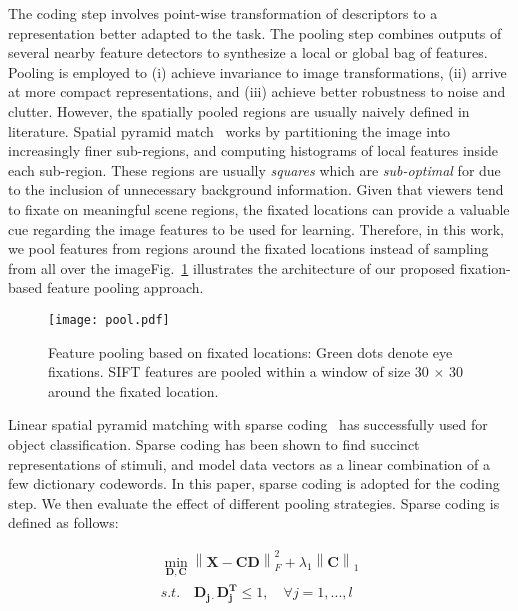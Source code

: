 \documentclass{article}
\begin{document}
The coding step involves point-wise transformation of descriptors to a representation better adapted to the task. The pooling step combines outputs of several nearby feature detectors to synthesize a local or global bag of features. Pooling is employed to (i) achieve invariance to image transformations, (ii) arrive at more compact representations, and (iii) achieve better robustness to noise and clutter. However, the spatially pooled regions are usually naively defined in literature. Spatial pyramid match~\cite{Yang09CVPR} works by partitioning the image into increasingly finer sub-regions, and computing histograms of local features inside each sub-region. These regions are usually \textit{squares} which are \textit{sub-optimal} for due to the inclusion of unnecessary background information. Given that viewers tend to fixate on meaningful scene regions, the fixated locations can provide a valuable cue regarding the image features to be used for learning. Therefore, in this work, we pool features from regions around the fixated locations instead of sampling from all over the imageFig.~\ref{fig:pool} illustrates the architecture of our proposed fixation-based feature pooling approach.

\begin{figure}[htbp]
\texttt{[image: pool.pdf]}\vspace{-0.02in}
\caption{Feature pooling based on fixated locations: Green dots denote eye fixations. SIFT features are pooled within a window of size 30 $\times$ 30 around the fixated location.}
\label{fig:pool}
\end{figure}

Linear spatial pyramid matching with sparse coding~\cite{Yang09CVPR} has successfully used for object classification. Sparse coding has been shown to find succinct representations of stimuli, and model data vectors as a linear combination of a few dictionary codewords. In this paper, sparse coding is adopted for the coding step. We then evaluate the effect of different pooling strategies. Sparse coding is defined as follows:

\begin{equation}
\label{eqn:1}
\begin{array}{l}
\mathop {\min }\limits_{\mathbf{D,C}} {\left\| {\mathbf{X} - \mathbf{C D} } \right\|_F^2 + \lambda _1 {\left\| {\mathbf{C} } \right\|_1 } } \\ \nonumber
s.t. \quad {\mathbf{D_{j \cdot } D_{j }^T} \le 1, \quad \forall j = 1,...,l} \\
\end{array}
\end{equation}
\end{document}
